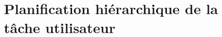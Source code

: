 \newcommand{\option}[1]{\textbf{\texttt{#1}}}

\section{Planification hiérarchique de la tâche utilisateur}


\newcommand{\dtudf}[5]
{
    \addtocounter{ndtudf}{1}
    \setcounter{nacteur}{#1}
    \setcounter{nitma}{0}
    \setcounter{ndau}{0}
    \begin{center}
	\begin{longtable}{|p{12cm}|c|}
	    \hline
		\multicolumn{2}{|l|}{DTU/DF \thendtudf} \\
	    \hline
		\multicolumn{2}{|l|}{U#1 -- #3} \\
	    \hline
		\multicolumn{2}{|l|}{DF #2 -- #4} \\
	    \hline
		#5 
	    \hline
	\end{longtable}
    \end{center}
}

\newcommand{\itmasup}[1]{T.\thenacteur.\thendtudf)~#1 \dotfill{}}
\newcommand{\itma}[1]{\setcounter{nitmaa}{0}\addtocounter{nitma}{1}{}T.\thenacteur.\thendtudf.\thenitma{})~#1 \dotfill{}}
\newcommand{\itmaa}[1]{\addtocounter{nitmaa}{1}{}~~~~T.\thenacteur.\thendtudf.\thenitma{}.\thenitmaa{})~#1 \dotfill{}}
\newcommand{\asub}[1]{~~~~a.#1\dotfill}

